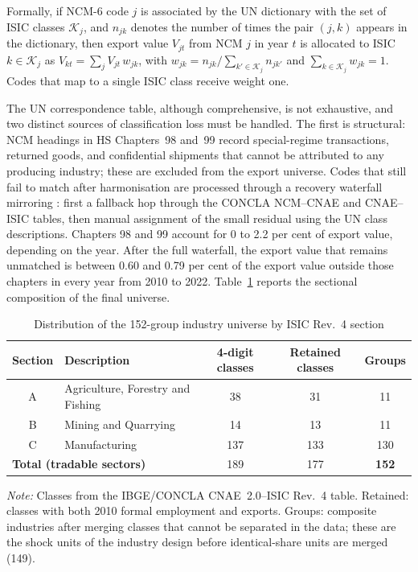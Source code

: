 \documentclass[
	11pt,				%
	oneside,			%
	a4paper,			%
	english,			%
	english				%
	]{abntex2ppgsi}
\theoremstyle{plain}
\theoremstyle{remark}
\theoremstyle{plain}%
\theoremstyle{remark}%
\begin{document}
\begin{apendicesenv}
Formally, if NCM-6 code $j$ is associated by the UN dictionary with the set of
ISIC classes $\mathcal{K}_j$, and $n_{jk}$ denotes the number of times the pair
$(j,k)$ appears in the dictionary, then export value $V_{jt}$ from NCM $j$ in
year $t$ is allocated to ISIC $k \in \mathcal{K}_j$ as
$V_{kt} = \sum_{j} V_{jt}\,w_{jk}$, with
$w_{jk} = n_{jk} \big/ \sum_{k'\in\mathcal{K}_j} n_{jk'}$ and
$\sum_{k\in\mathcal{K}_j} w_{jk} = 1$. Codes that map to a single ISIC class receive weight one.


The UN correspondence table, although comprehensive, is not exhaustive,
and two distinct sources of classification loss must be handled. The first
is structural: NCM headings in HS Chapters~98 and~99 record special-regime
transactions, returned goods, and confidential shipments that cannot be
attributed to any producing industry; these are excluded from the export
universe. 
Codes that still fail to match after harmonisation are
processed through a recovery waterfall mirroring : first a
fallback hop through the CONCLA NCM--CNAE and CNAE--ISIC tables, then manual
assignment of the small residual using the UN class descriptions. Chapters 98 and 99 account for 0 to 2.2 per cent of export value, depending on the year. After the full waterfall, the export value that remains unmatched is between 0.60 and 0.79 per cent of the export value outside those chapters in every year from 2010 to 2022. Table~\ref{tab:isic_section_counts} reports the sectional composition of the final universe.


\begin{table}[htbp]
  \centering
  \caption{Distribution of the 152-group industry universe by ISIC Rev.~4 section}
  \label{tab:isic_section_counts}
  \begin{tabular}{clccc}
    \toprule
    \textbf{Section} & \textbf{Description} &
    \textbf{4-digit classes} & \textbf{Retained classes} & \textbf{Groups} \\
    \midrule
    A & Agriculture, Forestry and Fishing      & 38  & 31 & 11 \\
    B & Mining and Quarrying                   & 14  & 13 & 11 \\
    C & Manufacturing                          & 137 & 133 & 130 \\
    \midrule
    \multicolumn{2}{l}{\textbf{Total (tradable sectors)}} & 189 & 177 & \textbf{152} \\
    \bottomrule
  \end{tabular}
  \footnotesize
  \par\medskip
  \textit{Note:} Classes from the IBGE/CONCLA CNAE~2.0--ISIC Rev.~4 table. Retained: classes with both 2010 formal employment and exports. Groups: composite industries after merging classes that cannot be separated in the data; these are the shock units of the industry design before identical-share units are merged (149).
\end{table}


\end{apendicesenv}
\end{document}
